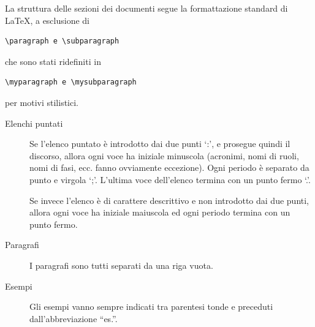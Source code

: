 \documentclass[a4paper, titlepage]{article}
\begin{document}
La struttura delle sezioni dei documenti segue la formattazione standard di \LaTeX , a esclusione di \begin{verbatim}\paragraph e \subparagraph\end{verbatim} che sono stati ridefiniti in \begin{verbatim}\myparagraph e \mysubparagraph\end{verbatim} per motivi stilistici.

\begin{description}
	\item[Elenchi puntati] 
	Se l'elenco puntato è introdotto dai due punti `:', e prosegue quindi il discorso, allora ogni voce ha iniziale minuscola (acronimi, nomi di ruoli, nomi di fasi, ecc. fanno ovviamente eccezione). Ogni periodo è separato da punto e virgola `;'. L'ultima voce dell'elenco termina con un punto fermo `.'.
	
	Se invece l'elenco è di carattere descrittivo e non introdotto dai due punti, allora ogni voce ha iniziale maiuscola ed ogni periodo termina con un punto fermo.
	\item[Paragrafi] 
	I paragrafi sono tutti separati da una riga vuota.
	\item[Esempi] 
	Gli esempi vanno sempre indicati tra parentesi tonde e preceduti dall'abbreviazione ``es.''.
\end{description}
\end{document}
